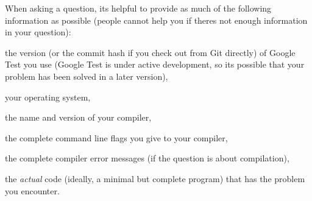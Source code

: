 When asking a question, it\textquotesingle{}s helpful to provide as much of the following information as possible (people cannot help you if there\textquotesingle{}s not enough information in your question)\+:


\begin{DoxyItemize}
\item the version (or the commit hash if you check out from Git directly) of Google Test you use (Google Test is under active development, so it\textquotesingle{}s possible that your problem has been solved in a later version),
\item your operating system,
\item the name and version of your compiler,
\item the complete command line flags you give to your compiler,
\item the complete compiler error messages (if the question is about compilation),
\item the {\itshape actual} code (ideally, a minimal but complete program) that has the problem you encounter. 
\end{DoxyItemize}